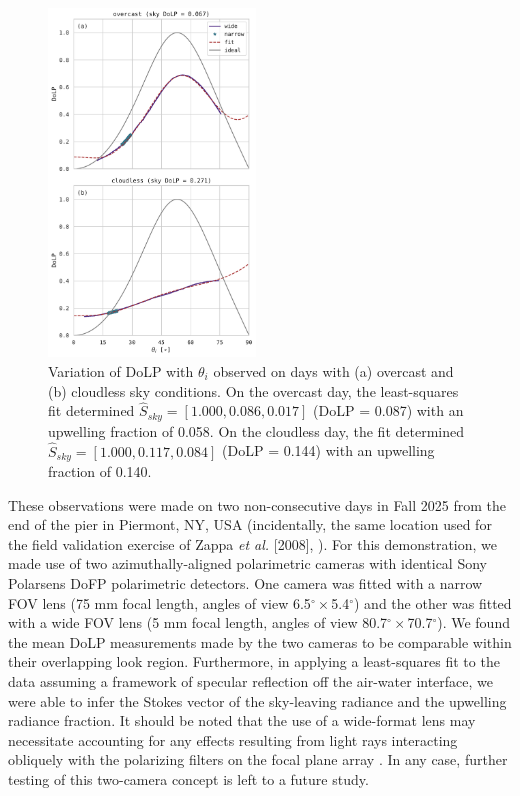 \documentclass[letterpaper,journal]{IEEEtran}
\begin{document}

\begin{figure}[!hb]
    \centering
    \includegraphics[width=0.49\textwidth]{_figures/DoLP_AOI_field.pdf}
    \vspace{-25pt}
    \caption{Variation of DoLP with $\theta_i$ observed on days with (a) overcast and (b) cloudless sky conditions. On the overcast day, the least-squares fit determined $\hat{S}_{sky}=[1.000,0.086,0.017]$ (DoLP = 0.087) with an upwelling fraction of 0.058. On the cloudless day, the fit determined $\hat{S}_{sky}=[1.000,0.117,0.084]$ (DoLP = 0.144) with an upwelling fraction of 0.140.}
    \label{fig:DoLP_AOI_field}
\end{figure}

These observations were made on two non-consecutive days in Fall 2025 from the end of the pier in Piermont, NY, USA (incidentally, the same location used for the field validation exercise of Zappa \emph{et al.} [2008], \cite{Zappa2008}). For this demonstration, we made use of two azimuthally-aligned polarimetric cameras with identical Sony Polarsens DoFP polarimetric detectors. One camera was fitted with a narrow FOV lens (75 mm focal length, angles of view 6.5$^{\circ}\times$5.4$^{\circ}$) and the other was fitted with a wide FOV lens (5 mm focal length, angles of view 80.7$^{\circ}\times$70.7$^{\circ}$). We found the mean DoLP measurements made by the two cameras to be comparable within their overlapping look region. Furthermore, in applying a least-squares fit to the data assuming a framework of specular reflection off the air-water interface, we were able to infer the Stokes vector of the sky-leaving radiance and the upwelling radiance fraction. It should be noted that the use of a wide-format lens may necessitate accounting for any effects resulting from light rays interacting obliquely with the polarizing filters on the focal plane array \cite{pistellato_geometric_2024}. In any case, further testing of this two-camera concept is left to a future study.
\end{document}
